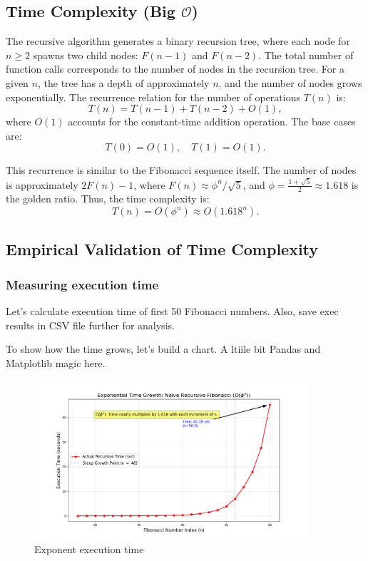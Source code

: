 \documentclass{article}
\begin{document}
\subsection{Time Complexity (Big $\mathcal{O}$)}
The recursive algorithm generates a binary recursion tree, where each node for \( n \geq 2 \) spawns two child nodes: \( F(n-1) \) and \( F(n-2) \).
The total number of function calls corresponds to the number of nodes in the recursion tree. For a given \( n \), the tree has a depth of approximately \( n \), and the number of nodes grows exponentially. The recurrence relation for the number of operations \( T(n) \) is:
\[
T(n) = T(n-1) + T(n-2) + O(1),
\]
where \( O(1) \) accounts for the constant-time addition operation. The base cases are:
\[
T(0) = O(1), \quad T(1) = O(1).
\]

This recurrence is similar to the Fibonacci sequence itself. The number of nodes is approximately \( 2F(n) - 1 \), where \( F(n) \approx \phi^n / \sqrt{5} \), and \( \phi = \frac{1 + \sqrt{5}}{2} \approx 1.618 \) is the golden ratio. Thus, the time complexity is:
\[
T(n) = O(\phi^n) \approx O(1.618^n).
\]

\subsection{Empirical Validation of Time Complexity}
\subsubsection{Measuring execution time}
Let's calculate execution time of first 50 Fibonacci numbers. Also, save exec results in CSV file further for analysis.

To show how the time grows, let's build a chart. A ltiile bit Pandas and Matplotlib magic here.
\begin{figure}[H]
	\centering
	\includegraphics[width=0.9\textwidth]{./recursive-time-exec/exponential-time-growth.png}
	\caption{Exponent execution time}
	\label{fig:exponent_growth}
\end{figure}
\end{document}
